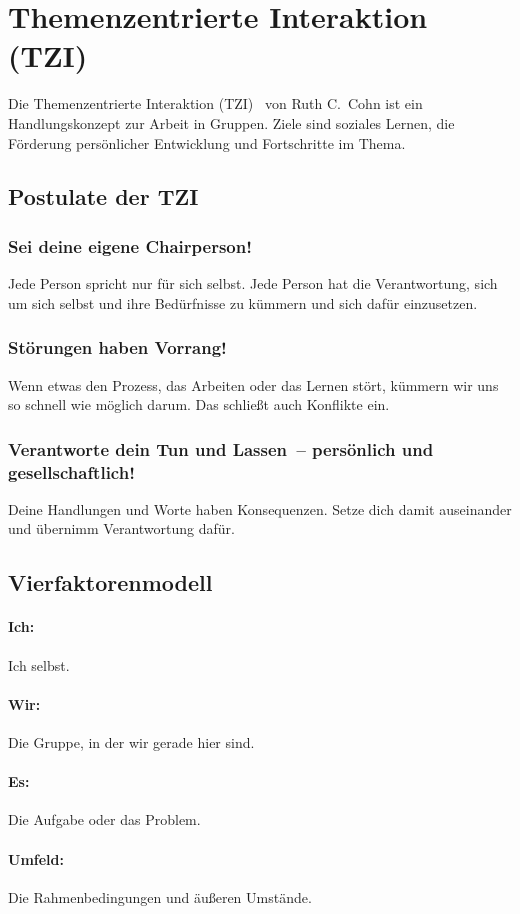 \section{Themenzentrierte Interaktion (TZI)}
\label{tzi}

Die Themenzentrierte Interaktion (TZI)~\cite{tzi-cohn, tzi-reiser} von Ruth C.~Cohn ist ein Handlungskonzept zur Arbeit in Gruppen. Ziele sind soziales Lernen, die Förderung persönlicher Entwicklung und Fortschritte im Thema.

\subsection{Postulate der TZI}

\subsubsection{Sei deine eigene Chairperson!}

Jede Person spricht nur für sich selbst. Jede Person hat die Verantwortung, sich um sich selbst und ihre Bedürfnisse zu kümmern und sich dafür einzusetzen.

\subsubsection{Störungen haben Vorrang!}

Wenn etwas den Prozess, das Arbeiten oder das Lernen stört, kümmern wir uns so schnell wie möglich darum. Das schließt auch Konflikte ein.

\subsubsection{Verantworte dein Tun und Lassen~-- persönlich und gesellschaftlich!}

Deine Handlungen und Worte haben Konsequenzen. Setze dich damit auseinander und übernimm Verantwortung dafür.

\subsection{Vierfaktorenmodell}

\paragraph{Ich:} Ich selbst.

\paragraph{Wir:} Die Gruppe, in der wir gerade hier sind.

\paragraph{Es:} Die Aufgabe oder das Problem.

\paragraph{Umfeld:} Die Rahmenbedingungen und äußeren Umstände.
